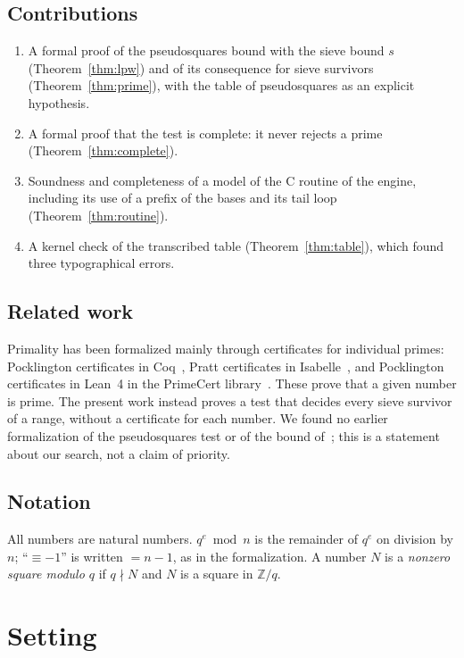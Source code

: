 \documentclass[11pt]{amsart}
\theoremstyle{definition}
\begin{document}
\subsection*{Contributions}
\begin{enumerate}
  \item[(C1)] A formal proof of the pseudosquares bound with the sieve bound $s$
    (Theorem~\ref{thm:lpw}) and of its consequence for sieve survivors (Theorem~\ref{thm:prime}),
    with the table of pseudosquares as an explicit hypothesis.
  \item[(C2)] A formal proof that the test is complete: it never rejects a prime
    (Theorem~\ref{thm:complete}).
  \item[(C3)] Soundness and completeness of a model of the C routine of the engine, including
    its use of a prefix of the bases and its tail loop (Theorem~\ref{thm:routine}).
  \item[(C4)] A kernel check of the transcribed table (Theorem~\ref{thm:table}), which found three
    typographical errors.
\end{enumerate}

\subsection*{Related work}
Primality has been formalized mainly through certificates for individual primes: Pocklington
certificates in Coq~\cite{coqprime}, Pratt certificates in Isabelle~\cite{pratt}, and
Pocklington certificates in Lean~4 in the PrimeCert library~\cite{primecert}. These prove that a
given number is prime. The present work instead proves a test that decides every sieve survivor
of a range, without a certificate for each number. We found no earlier formalization of the
pseudosquares test or of the bound of~\cite{lpw, sorenson2006}; this is a statement about our
search, not a claim of priority.

\subsection*{Notation}
All numbers are natural numbers. $q^{e} \bmod n$ is the remainder of $q^e$ on division by $n$;
``$\equiv -1$'' is written $= n - 1$, as in the formalization. A number $N$ is a
\emph{nonzero square modulo $q$} if $q \nmid N$ and $N$ is a square in $\mathbb{Z}/q$.

\section{Setting}
\end{document}
